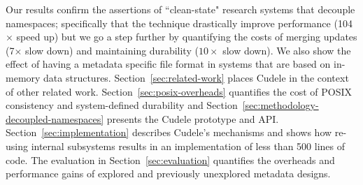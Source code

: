 Our results confirm the assertions of ``clean-state" research systems that
decouple namespaces; specifically that the technique drastically improve
performance (104\(\times\) speed up) but we go a step further by quantifying
the costs of merging updates (7\(\times\) slow down) and maintaining durability
(\(10\times\) slow down). We also show the effect of having a metadata specific
file format in systems that are based on in-memory data structures.
Section~\ref{sec:related-work} places Cudele in the context of other related
work. Section~\ref{sec:posix-overheads} quantifies the cost of POSIX
consistency and system-defined durability and
Section~\ref{sec:methodology-decoupled-namespaces} presents the Cudele
prototype and API. Section~\ref{sec:implementation} describes Cudele's
mechanisms and shows how re-using internal subsystems results in an
implementation of less than 500 lines of code. The evaluation in
Section~\ref{sec:evaluation} quantifies the overheads and performance gains of
explored and previously unexplored metadata designs.

